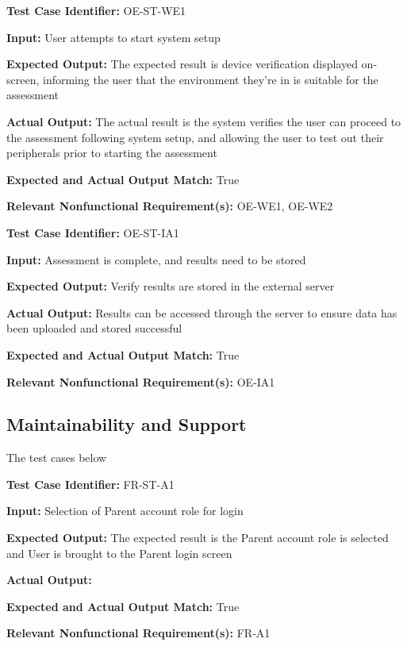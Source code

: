 \documentclass[12pt, titlepage]{article}
\begin{document}
\begin{mdframed}[linewidth=0.5mm] \par
  \textbf{Test Case Identifier:} OE-ST-WE1 \par
  \textbf{Input:} User attempts to start system setup \par
  \textbf{Expected Output:} The expected result is device verification displayed on-screen, informing the user that the environment they're in is suitable for the assessment \par
  \textbf{Actual Output:} The actual result is the system verifies the user can proceed to the assessment following system setup, and allowing the user to test out their peripherals prior to starting the assessment \par
  \textbf{Expected and Actual Output Match:} True \par
  \textbf{Relevant Nonfunctional Requirement(s):} OE-WE1, OE-WE2
\end{mdframed}

\begin{mdframed}[linewidth=0.5mm] \par
  \textbf{Test Case Identifier:} OE-ST-IA1 \par
  \textbf{Input:} Assessment is complete, and results need to be stored \par
  \textbf{Expected Output:} Verify results are stored in the external server \par
  \textbf{Actual Output:} Results can be accessed through the server to ensure data has been uploaded and stored successful\par
  \textbf{Expected and Actual Output Match:} True \par
  \textbf{Relevant Nonfunctional Requirement(s):} OE-IA1
\end{mdframed}

\subsection{Maintainability and Support}
\hspace{2em}The test cases below 

\begin{mdframed}[linewidth=0.5mm] \par
  \textbf{Test Case Identifier:} FR-ST-A1 \par
  \textbf{Input:} Selection of Parent account role for login \par
  \textbf{Expected Output:} The expected result is the Parent account role is selected and User is brought to the Parent login screen \par
  \textbf{Actual Output:} \par
  \textbf{Expected and Actual Output Match:} True \par
  \textbf{Relevant Nonfunctional Requirement(s):} FR-A1
\end{mdframed}
\end{document}
